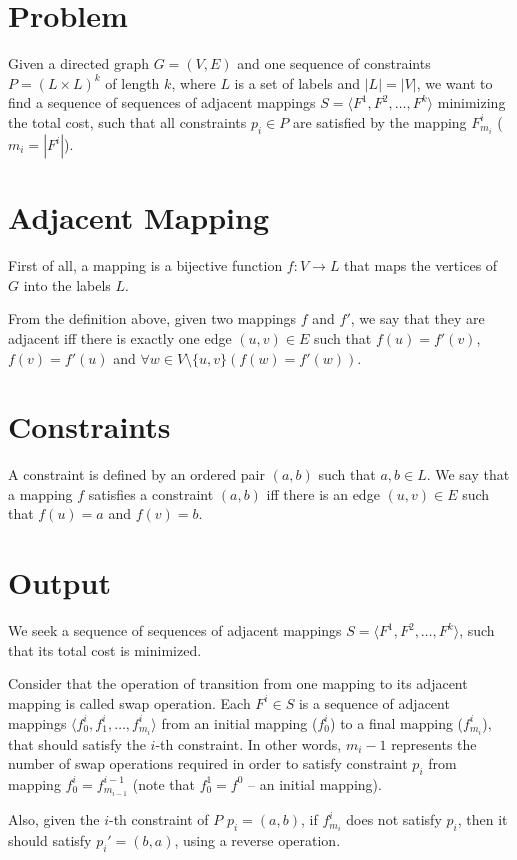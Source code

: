 \documentclass[paper=a4, fontsize=12pt]{scrartcl}
\begin{document}
	\section{Problem}
	Given a directed graph $G=(V, E)$ and one sequence of constraints $P=(L \times L)^k$ of length $k$, where $L$ is a set of labels and $|L| = |V|$, we want to find a sequence of sequences of adjacent mappings $S=\langle F^1, F^2, \dots, F^k \rangle$ minimizing the total cost, such that all constraints $p_i \in P$ are satisfied by the mapping $F^i_{m_i}$ ($m_i = |F^i|$).
	
	\section{Adjacent Mapping}
	First of all, a mapping is a bijective function $f:V \rightarrow L$ that maps the vertices of $G$ into the labels $L$.
	
	From the definition above, given two mappings $f$ and $f'$, we say that they are adjacent iff there is exactly one edge $(u, v) \in E$ such that $f(u) = f'(v)$, $f(v) = f'(u)$ and $\forall{w \in V\setminus\{u, v\}}(f(w) = f'(w))$.
	
	\section{Constraints}
	A constraint is defined by an ordered pair $(a, b)$ such that $a,b \in L$. We say that a mapping $f$ satisfies a constraint $(a, b)$ iff there is an edge $(u, v) \in E$ such that $f(u)=a$ and $f(v)=b$.
	
	\section{Output}
	We seek a sequence of sequences of adjacent mappings $S=\langle F^1, F^2, \dots, F^k \rangle$, such that its total cost is minimized.
	
	Consider that the operation of transition from one mapping to its adjacent mapping is called swap operation. Each $F^i \in S$ is a sequence of adjacent mappings $\langle f^i_0, f^i_1, \dots, f^i_{m_i} \rangle$ from an initial mapping ($f^i_0$) to a final mapping ($f^i_{m_i}$), that should satisfy the $i$-th constraint. In other words, $m_i-1$ represents the number of swap operations required in order to satisfy constraint $p_i$ from mapping $f^i_0 = f^{i-1}_{m_{i-1}}$ (note that $f^1_0 = f^0$ -- an initial mapping).
	
	Also, given the $i$-th constraint of $P$ $p_i = (a, b)$, if $f^i_{m_i}$ does not satisfy $p_i$, then it should satisfy $p_i'=(b, a)$, using a reverse operation.
	
\end{document}
